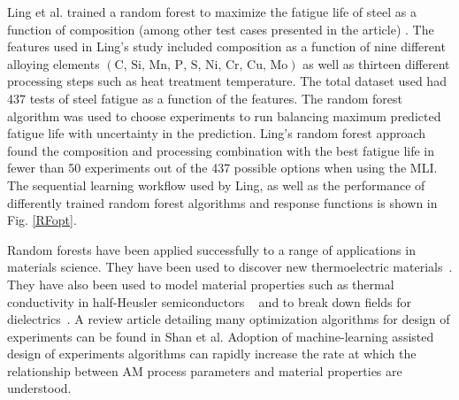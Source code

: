Ling et al. trained a random forest to maximize the fatigue life of steel as a function of composition (among other test cases presented in the article) \cite{Ling2017}. The features used in Ling's study included composition as a function of nine different alloying elements $\left(\text{C, Si, Mn, P, S, Ni, Cr, Cu, Mo}\right)$ as well as thirteen different processing steps such as heat treatment temperature. The total dataset used had 437 tests of steel fatigue as a function of the features. The random forest algorithm was used to choose experiments to run balancing maximum predicted fatigue life with uncertainty in the prediction. Ling's random forest approach found the composition and processing combination with the best fatigue life in fewer than 50 experiments out of the 437 possible options when using the MLI. The sequential learning workflow used by Ling, as well as the performance of differently trained random forest algorithms and response functions is shown in Fig. \ref{RFopt}.



Random forests have been applied successfully to a range of applications in materials science. They have been used to discover new thermoelectric materials~\cite{Gaultois2016}. They have also been used to model material properties such as thermal conductivity in half-Heusler semiconductors ~\cite{Carrete2014} and to break down fields for dielectrics~\cite{Kim2016}.  A review article detailing many optimization algorithms for design of experiments can be found in Shan et al\cite{Shan2010}. Adoption of machine-learning assisted design of experiments algorithms can rapidly increase the rate at which the relationship between AM process parameters and material properties are understood. 
